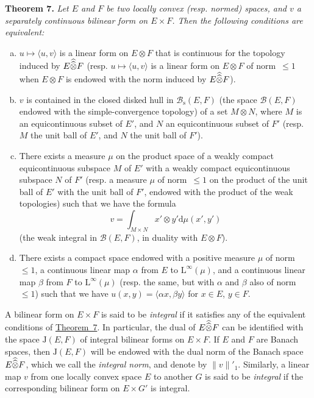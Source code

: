 \documentclass{article}
\theoremstyle{plain}
\newenvironment{itenv}[1]
  {\phantomsection\par\medskip\noindent\textbf{#1.}\itshape}
  {\medskip}
\newcommand{\LL}{\mathrm{L}}
\newcommand{\JJ}{\mathrm{J}}
\newcommand{\sBB}{\mathscr{B}}
\newcommand{\hhotimes}{\skew{0}{\widehat}{\skew{0}\widehat{\otimes}}}
\newcommand{\dd}{\mathrm{d}}
\newcommand{\oldpage}[1]{\marginpar{\footnotesize$\Big\vert$ \textit{p.~#1}}}
\begin{document}
\begin{itenv}{Theorem 7}
\label{1.theorem7}
  Let $E$ and $F$ be two locally convex (resp. normed) spaces, and $v$ a separately continuous bilinear form on $E\times F$.
  Then the following conditions are equivalent:
  \begin{enumerate}[a)]
    \item $u\mapsto\langle u,v\rangle$ is a linear form on $E\otimes F$ that is continuous for the topology induced by $E\hhotimes F$ (resp. $u\mapsto\langle u,v\rangle$ is a linear form on $E\otimes F$ of norm~$\leq1$ when $E\otimes F$ is endowed with the norm induced by $E\hhotimes F$).
    \item $v$ is contained in the closed disked hull in $\sBB_\mathrm{s}(E,F)$ (the space $\sBB(E,F)$ endowed with the simple-convergence topology) of a set $M\otimes N$, where $M$ is an equicontinuous subset of $E'$, and $N$ an equicontinuous subset of $F'$ (resp. $M$ the unit ball of $E'$, and $N$ the unit ball of $F'$).
    \item There exists a measure $\mu$ on the product space of a weakly compact equicontinuous subspace $M$ of $E'$ with a weakly compact equicontinuous subspace $N$ of $F'$ (resp. a measure $\mu$ of norm~$\leq1$ on the product of the unit ball of $E'$ with the unit ball of $F'$, endowed with the product of the weak topologies) such that we have the formula
      \[
        v = \int_{M\times N} x'\otimes y' \dd\mu(x',y')
      \]
      (the weak integral in $\sBB(E,F)$, in duality with $E\otimes F$).
    \item There exists a compact space endowed with a positive measure $\mu$ of norm~$\leq1$, a continuous linear map $\alpha$ from $E$ to $\LL^\infty(\mu)$, and a continuous linear map $\beta$ from $F$ to $\LL^\infty(\mu)$ (resp. the same, but with $\alpha$ and $\beta$
\oldpage{88}
      also of norm~$\leq1$) such that we have $u(x,y)=\langle\alpha x,\beta y\rangle$ for $x\in E$, $y\in F$.
  \end{enumerate}
\end{itenv}

A bilinear form on $E\times F$ is said to be \emph{integral} if it satisfies any of the equivalent conditions of \hyperref[1.theorem7]{Theorem~7}.
In particular, the dual of $E\hhotimes F$ can be identified with the space $\JJ(E,F)$ of integral bilinear forms on $E\times F$.
If $E$ and $F$ are Banach spaces, then $\JJ(E,F)$ will be endowed with the dual norm of the Banach space $E\hhotimes F$, which we call the \emph{integral norm}, and denote by $\|v\|'_1$.
Similarly, a linear map $v$ from one locally convex space $E$ to another $G$ is said to be \emph{integral} if the corresponding bilinear form on $E\times G'$ is integral.
\end{document}
